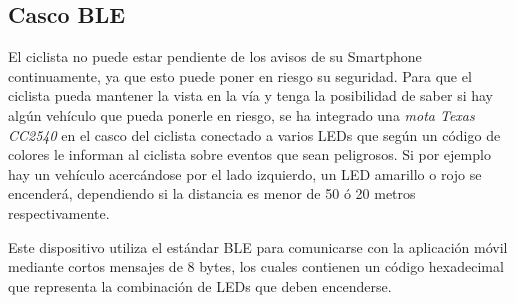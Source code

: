 \subsection{Casco BLE}\label{ssection:cascoBLE}
El ciclista no puede estar pendiente de los avisos de su Smartphone continuamente,
ya que esto puede poner en riesgo su seguridad. Para que el ciclista pueda mantener
la vista en la vía y tenga la posibilidad de saber si hay algún vehículo que pueda
ponerle en riesgo, se ha integrado una \emph{mota Texas CC2540} en el casco del
ciclista conectado a varios LEDs que según un código de colores le informan al ciclista
sobre eventos que sean peligrosos. Si por ejemplo hay un vehículo acercándose por
el lado izquierdo, un LED amarillo o rojo se encenderá, dependiendo si la distancia
es menor de 50 ó 20 metros respectivamente.

Este dispositivo utiliza el estándar BLE para comunicarse con la aplicación móvil
mediante cortos mensajes de 8 bytes, los cuales contienen un código hexadecimal que
representa la combinación de LEDs que deben encenderse.

